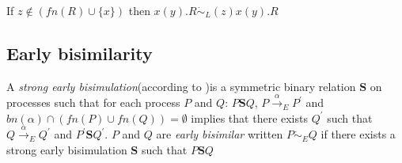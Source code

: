 \begin{example}
  If $z\notin (fn(R)\cup \{x\})$ then $x(y).R \dot{\sim}_{L} (z)x(y).R$
\end{example}



\subsection{Early bisimilarity}

\begin{definition}
  A \emph{strong early bisimulation}(according to \cite{parrow})is a symmetric binary relation $\mathbf{S}$ on processes such that for each process $P$ and $Q$: $P\mathbf{S} Q$, $P \xrightarrow{\alpha}_{E} P^{'}$ and $bn(\alpha) \cap (fn(P) \cup fn(Q))=\emptyset$ implies that there exists $Q^{'}$ such that $Q \xrightarrow{\alpha}_{E} Q^{'}$ and $P^{'}\mathbf{S}Q^{'}$. $P$ and $Q$ are \emph{early bisimilar} written $P\dot{\sim}_{E}Q$ if there exists a strong early bisimulation $\mathbf{S}$ such that $P\mathbf{S}Q$
\end{definition}

